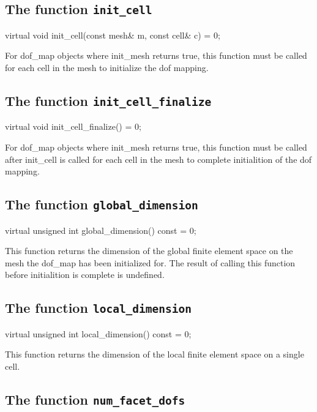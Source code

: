 \subsection{The function \texttt{init\_cell}}

\begin{code}
virtual void init_cell(const mesh& m,
                       const cell& c) = 0;
\end{code}

For dof\_map objects where init\_mesh returns true,
this function must be called for each cell in the mesh
to initialize the dof mapping.

\subsection{The function \texttt{init\_cell\_finalize}}

\begin{code}
virtual void init_cell_finalize() = 0;
\end{code}

For dof\_map objects where init\_mesh returns true,
this function must be called after init\_cell is called for each cell in the mesh
to complete initialition of the dof mapping.

\subsection{The function \texttt{global\_dimension}}

\begin{code}
virtual unsigned int global_dimension() const = 0;
\end{code}

This function returns the dimension of the global finite element space on the mesh
the dof\_map has been initialized for.
The result of calling this function before initialition is complete is undefined.

\subsection{The function \texttt{local\_dimension}}

\begin{code}
virtual unsigned int local_dimension() const = 0;
\end{code}

This function returns the dimension of the local finite element space on a single cell.

\subsection{The function \texttt{num\_facet\_dofs}}

